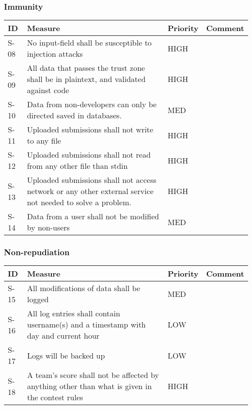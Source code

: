 \subsubsection{Immunity}
\begin{supertabular}{|l|p{7cm}|l|p{5cm}|}
\hline
\textbf{ID} & \textbf{Measure} & \textbf{Priority} & \textbf{Comment} \\ 
\hline
S-08 & No input-field shall be susceptible to injection attacks & HIGH& \\ 
\hline

S-09 & All data that passes the trust zone shall be in plaintext, and validated
against code & HIGH & \\ 
\hline

S-10 & Data from non-developers
can only be directed saved in databases. & MED & \\ 
\hline

S-11 & Uploaded submissions shall not write to any file & HIGH & \\ 
\hline

S-12 & Uploaded submissions shall not read from any other file than stdin &HIGH & \\ 
\hline

S-13 & Uploaded submissions shall not access network or any other
external service not needed to solve a problem.  & HIGH & \\ 
\hline

S-14 & Data from a user shall not be modified by non-users & MED & \\ 
\hline
\end{supertabular}


\subsubsection{Non-repudiation}
\begin{supertabular}{|l|p{7cm}|l|p{5cm}|}
\hline
\textbf{ID} & \textbf{Measure} & \textbf{Priority} & \textbf{Comment} \\ 
\hline
S-15 & All modifications of data shall be logged & MED &\\ 
\hline

S-16 & All log entries shall contain username(s) and a timestamp with day and
current hour & LOW & \\ 
\hline

S-17 & Logs will be backed up & LOW & \\
\hline

S-18 & A team's score shall not be affected by anything other than what is given
in the contest rules & HIGH & \\ 
\hline
\end{supertabular}


